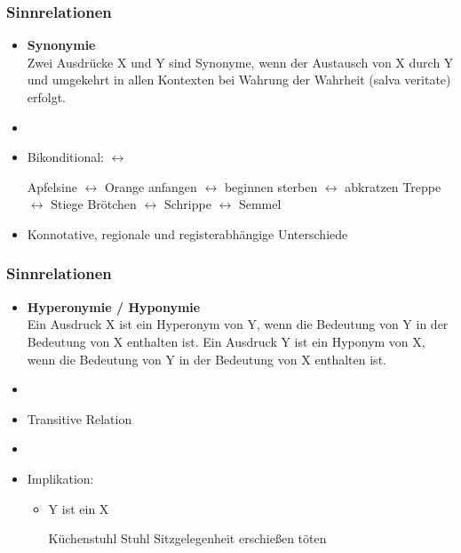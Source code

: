 
\begin{frame}
\frametitle{Sinnrelationen}

\begin{itemize}
	\item \textbf{Synonymie}\\Zwei Ausdrücke X und Y sind Synonyme, wenn der Austausch von X durch Y und umgekehrt in allen Kontexten bei Wahrung der Wahrheit (salva veritate) erfolgt.
	\item[]
	\item Bikonditional: $\leftrightarrow$
	
	\eal
		\ex Apfelsine $\leftrightarrow$ Orange
		\ex anfangen $\leftrightarrow$ beginnen
		\ex sterben $\leftrightarrow$ abkratzen
		\ex Treppe $\leftrightarrow$ Stiege
		\ex Brötchen $\leftrightarrow$ Schrippe $\leftrightarrow$ Semmel
	\zl
	
	\item Konnotative, regionale und registerabhängige Unterschiede
\end{itemize}

\end{frame}



\begin{frame}
\frametitle{Sinnrelationen}

\begin{itemize}
	\item \textbf{Hyperonymie / Hyponymie}\\
Ein Ausdruck X ist ein Hyperonym von Y, wenn die Bedeutung von Y in der Bedeutung von X enthalten ist.
Ein Ausdruck Y ist ein Hyponym von X, wenn die Bedeutung von Y in der Bedeutung von X enthalten ist.
	\item[]	
	\item Transitive Relation
	\item[]
	\item Implikation: \ras
	
	\begin{itemize}
		\item Y ist ein X
		
		\eal 
		\ex Küchenstuhl \ras Stuhl \ras Sitzgelegenheit
		\ex erschie\ss{}en \ras töten
		\zl
		
	\end{itemize}
	
\end{itemize}

\end{frame}



